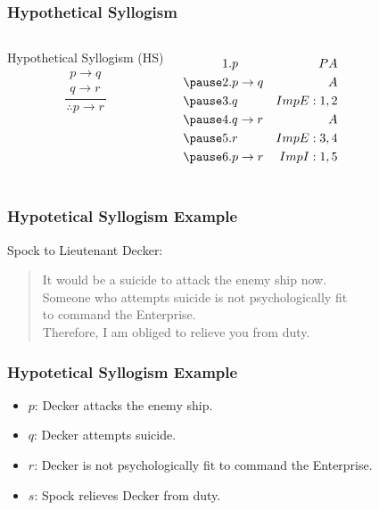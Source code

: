 \documentclass[dvipsnames]{beamer}
\begin{document}
\begin{frame}
  \frametitle{Hypothetical Syllogism}

  \begin{columns}
    \begin{block}{Hypothetical Syllogism (HS)}
      \[
      \frac
        {
          \begin{array}{c}
            p \rightarrow q\\
            q \rightarrow r
          \end{array}}
        {
          \therefore p \rightarrow r
        }
      \]
    \end{block}

    \pause
    \begin{eqnarray*}
      1. & p               & PA\\
      \pause
      2. & p \rightarrow q & A\\
      \pause
      3. & q               & ImpE:1,2\\
      \pause
      4. & q \rightarrow r & A\\
      \pause
      5. & r               & ImpE:3,4\\
      \pause
      6. & p \rightarrow r & ImpI:1,5\\
    \end{eqnarray*}
  \end{columns}
\end{frame}

\begin{frame}
  \frametitle{Hypotetical Syllogism Example}

  \begin{example}
    Spock to Lieutenant Decker:
    \begin{quote}
      It would be a suicide to attack the enemy ship now.\\
      Someone who attempts suicide is not psychologically fit\\
      to command the Enterprise.\\
      Therefore, I am obliged to relieve you from duty.
    \end{quote}
  \end{example}
\end{frame}

\begin{frame}
  \frametitle{Hypotetical Syllogism Example}

  \begin{example}
    \begin{itemize}
      \item $p$: Decker attacks the enemy ship.
      \item $q$: Decker attempts suicide.
      \item $r$: Decker is not psychologically fit to command the Enterprise.
      \item $s$: Spock relieves Decker from duty.
    \end{itemize}
  \end{example}
\end{frame}
\end{document}
